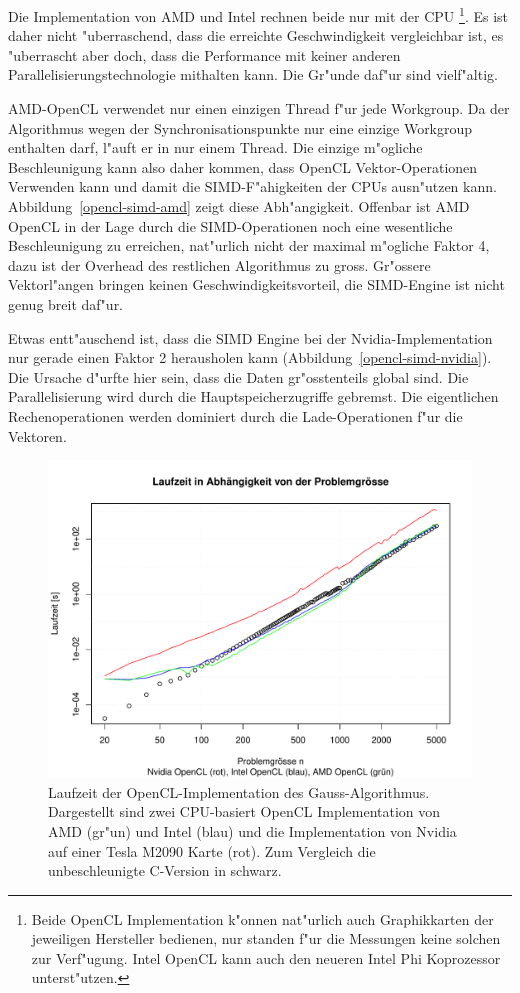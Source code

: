 Die Implementation von AMD und Intel rechnen beide nur mit der CPU%
\footnote{Beide OpenCL Implementation k"onnen nat"urlich auch Graphikkarten
der jeweiligen Hersteller bedienen, nur standen f"ur die Messungen
keine solchen zur Verf"ugung. Intel OpenCL kann auch den neueren Intel Phi
Koprozessor unterst"utzen.}.
Es ist daher nicht "uberraschend, dass die erreichte Geschwindigkeit
vergleichbar ist, es "uberrascht aber doch, dass die Performance mit
keiner anderen Parallelisierungstechnologie mithalten kann.
Die Gr"unde daf"ur sind vielf"altig.

AMD-OpenCL verwendet nur einen einzigen Thread f"ur jede Workgroup.
Da der Algorithmus wegen der Synchronisationspunkte nur eine einzige Workgroup
enthalten darf, l"auft er in nur einem Thread. Die einzige
m"ogliche Beschleunigung kann also daher kommen, dass OpenCL Vektor-Operationen
Verwenden kann und damit die SIMD-F"ahigkeiten der CPUs ausn"utzen kann.
Abbildung~\ref{opencl-simd-amd} zeigt diese Abh"angigkeit.
Offenbar ist AMD OpenCL in der Lage durch die SIMD-Operationen noch eine 
wesentliche Beschleunigung zu erreichen, nat"urlich nicht der maximal
m"ogliche Faktor 4, dazu ist der Overhead des restlichen Algorithmus
zu gross.
Gr"ossere Vektorl"angen bringen keinen Geschwindigkeitsvorteil, die
SIMD-Engine ist nicht genug breit daf"ur.

Etwas entt"auschend ist, dass die SIMD Engine bei der Nvidia-Implementation 
nur gerade einen Faktor 2 herausholen kann (Abbildung~\ref{opencl-simd-nvidia}).
Die Ursache d"urfte hier sein, dass die Daten gr"osstenteils global sind.
Die Parallelisierung wird durch die Hauptspeicherzugriffe gebremst.
Die eigentlichen Rechenoperationen werden dominiert durch die Lade-Operationen
f"ur die Vektoren.

\begin{figure}
\begin{center}
\includegraphics[width=\hsize]{images/gauss-opencl.pdf}
\end{center}
\caption{Laufzeit der OpenCL-Implementation des Gauss-Algorithmus.
Dargestellt sind
zwei CPU-basiert OpenCL Implementation von AMD (gr"un) und Intel (blau)
und die Implementation von Nvidia auf einer Tesla M2090 Karte (rot).
Zum Vergleich die unbeschleunigte C-Version in schwarz.
\label{opencl-results}}
\end{figure}

